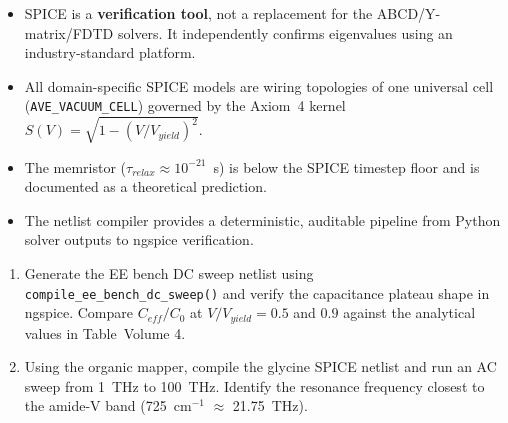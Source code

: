 \begin{summarybox}
\begin{itemize}
    \item SPICE is a \textbf{verification tool}, not a replacement for
          the ABCD/Y-matrix/FDTD solvers.  It independently confirms
          eigenvalues using an industry-standard platform.
    \item All domain-specific SPICE models are wiring topologies of one
          universal cell (\texttt{AVE\_VACUUM\_CELL}) governed by the
          Axiom~4 kernel $S(V) = \sqrt{1-(V/V_{yield})^2}$.
    \item The memristor ($\tau_{relax} \approx 10^{-21}$~s) is below
          the SPICE timestep floor and is documented as a theoretical
          prediction.
    \item The netlist compiler provides a deterministic, auditable
          pipeline from Python solver outputs to ngspice verification.
\end{itemize}
\end{summarybox}

\begin{exercisebox}
\begin{enumerate}
    \item Generate the EE bench DC sweep netlist using
          \texttt{compile\_ee\_bench\_dc\_sweep()} and verify the
          capacitance plateau shape in ngspice.  Compare $C_{eff}/C_0$
          at $V/V_{yield} = 0.5$ and $0.9$ against the analytical
          values in Table~Volume 4.
    \item Using the organic mapper, compile the glycine SPICE netlist
          and run an AC sweep from 1~THz to 100~THz.  Identify the
          resonance frequency closest to the amide-V band (725~cm$^{-1}$
          $\approx$ 21.75~THz).
\end{enumerate}
\end{exercisebox}
